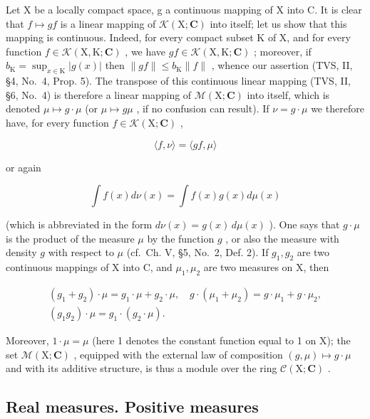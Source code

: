 Let X be a locally compact space, g a continuous mapping of X into C. It is clear that \(f \mapsto gf\) is a linear mapping of \(\mathcal{K}(\mathrm{X};\mathbf{C})\) into itself; let us show that this mapping is continuous. Indeed, for every compact subset K of X, and for every function \(f \in \mathcal{K}(\mathrm{X},\mathrm{K};\mathbf{C})\) , we have \(gf \in \mathcal{K}(\mathrm{X},\mathrm{K};\mathbf{C})\) ; moreover, if \(b_{\mathrm{K}} = \sup_{x \in \mathrm{K}} |g(x)|\) then \(\|gf\| \leqslant b_{\mathrm{K}} \|f\|\) , whence our assertion (TVS, II, §4, No.~4, Prop. 5). The transpose of this continuous linear mapping (TVS, II, §6, No.~4) is therefore a linear mapping of \(\mathcal{M}(\mathrm{X};\mathbf{C})\) into itself, which is denoted \(\mu \mapsto g \cdot \mu\) (or \(\mu \mapsto g\mu\) , if no confusion can result). If \(\nu = g \cdot \mu\) we therefore have, for every function \(f \in \mathcal{K}(\mathrm{X};\mathbf{C})\) ,

\[
\langle f, \nu \rangle = \langle g f, \mu \rangle\tag{6}
\]

or again

\[
\int f (x) d \nu (x) = \int f (x) g (x) d \mu (x)
\]

(which is abbreviated in the form \(d\nu(x) = g(x) \, d\mu(x)\) ). One says that \(g \cdot \mu\) is the product of the measure \(\mu\) by the function \(g\) , or also the measure with density \(g\) with respect to \(\mu\) (cf.~Ch. V, §5, No.~2, Def. 2). If \(g_1, g_2\) are two continuous mappings of X into C, and \(\mu_1, \mu_2\) are two measures on X, then

\[
\begin{array}{c} (g _ {1} + g _ {2}) \cdot \mu = g _ {1} \cdot \mu + g _ {2} \cdot \mu , \quad g \cdot (\mu_ {1} + \mu_ {2}) = g \cdot \mu_ {1} + g \cdot \mu_ {2}, \\ (g _ {1} g _ {2}) \cdot \mu = g _ {1} \cdot (g _ {2} \cdot \mu). \end{array}
\]

Moreover, \(1 \cdot \mu = \mu\) (here 1 denotes the constant function equal to 1 on X); the set \(\mathcal{M}(\mathrm{X};\mathbf{C})\) , equipped with the external law of composition \((g,\mu) \mapsto g \cdot \mu\) and with its additive structure, is thus a module over the ring \(\mathcal{C}(\mathrm{X};\mathbf{C})\) .

\subsection{Real measures. Positive measures}

